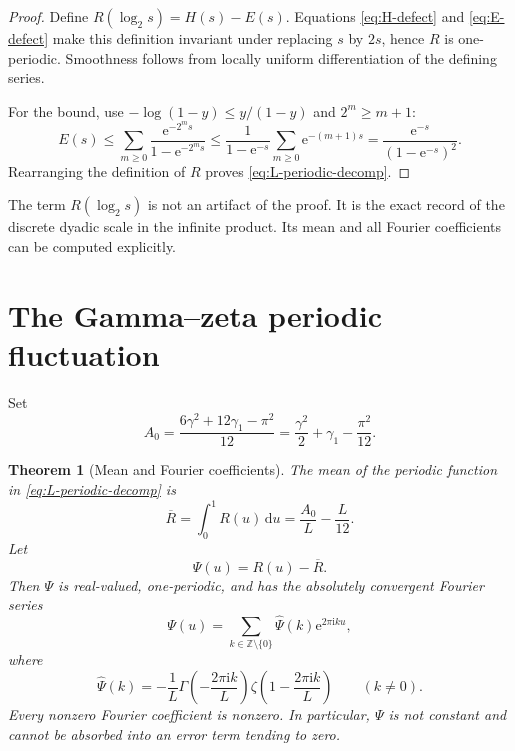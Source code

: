 \documentclass[11pt]{article}
\numberwithin{equation}{section}
\newtheorem{theorem}{Theorem}[section]
\theoremstyle{definition}
\theoremstyle{remark}
\newcommand{\Z}{\mathbb{Z}}
\newcommand{\dd}{\,\mathrm{d}}
\newcommand{\e}{\mathrm{e}}
\newcommand{\ii}{\mathrm{i}}
\begin{document}
\begin{proof}
Define $R(\log_2s)=H(s)-E(s)$.  Equations
\eqref{eq:H-defect} and \eqref{eq:E-defect} make this definition invariant
under replacing $s$ by $2s$, hence $R$ is one-periodic.  Smoothness follows
from locally uniform differentiation of the defining series.

For the bound, use $-\log(1-y)\le y/(1-y)$ and $2^m\ge m+1$:
\[
 E(s)\le\sum_{m\ge0}\frac{\e^{-2^ms}}{1-\e^{-2^ms}}
 \le\frac1{1-\e^{-s}}\sum_{m\ge0}\e^{-(m+1)s}
 =\frac{\e^{-s}}{(1-\e^{-s})^2}.
\]
Rearranging the definition of $R$ proves
\eqref{eq:L-periodic-decomp}.
\end{proof}

The term $R(\log_2s)$ is not an artifact of the proof.  It is the exact
record of the discrete dyadic scale in the infinite product.  Its mean and
all Fourier coefficients can be computed explicitly.

\section{The Gamma--zeta periodic fluctuation}\label{sec:periodic-fluctuation}

Set
\begin{equation}\label{eq:A0-def}
 A_0=\frac{6\gamma^2+12\gamma_1-\pi^2}{12}
 =\frac{\gamma^2}{2}+\gamma_1-\frac{\pi^2}{12}.
\end{equation}

\begin{theorem}[Mean and Fourier coefficients]\label{thm:psi-fourier}
The mean of the periodic function in \eqref{eq:L-periodic-decomp} is
\begin{equation}\label{eq:R-mean}
 \overline R=\int_0^1R(u)\dd u=\frac{A_0}{L}-\frac{L}{12}.
\end{equation}
Let
\begin{equation}\label{eq:Psi-def}
 \Psi(u)=R(u)-\overline R.
\end{equation}
Then $\Psi$ is real-valued, one-periodic, and has the absolutely convergent
Fourier series
\begin{equation}\label{eq:Psi-fourier}
 \Psi(u)=\sum_{k\in\Z\setminus\{0\}}\widehat\Psi(k)\e^{2\pi\ii ku},
\end{equation}
where
\begin{equation}\label{eq:Psi-coeff}
 \widehat\Psi(k)=
 -\frac1L\Gamma\left(-\frac{2\pi\ii k}{L}\right)
 \zeta\left(1-\frac{2\pi\ii k}{L}\right)
 \qquad(k\ne0).
\end{equation}
Every nonzero Fourier coefficient is nonzero.  In particular, $\Psi$ is not
constant and cannot be absorbed into an error term tending to zero.
\end{theorem}
\end{document}
